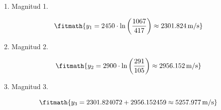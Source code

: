 \begin{enumerate}

\item Magnitud 1.

\[\fitmath{y_{1}=2450\cdot \ln\left(\frac{1067}{417}\right)\approx 2301.824\,\mathrm{m/s}}\]

\item Magnitud 2.

\[\fitmath{y_{2}=2900\cdot \ln\left(\frac{291}{105}\right)\approx 2956.152\,\mathrm{m/s}}\]

\item Magnitud 3.

\[\fitmath{y_{3}=2301.824072+2956.152459\approx 5257.977\,\mathrm{m/s}}\]

\end{enumerate}

